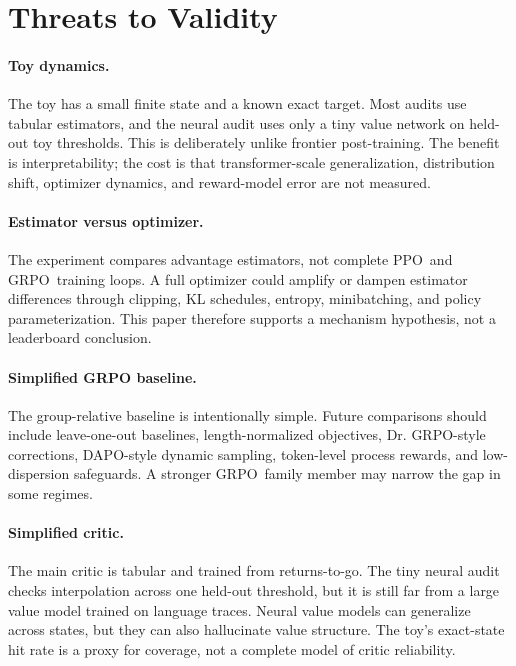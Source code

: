 \documentclass[11pt]{article}
\newcommand{\grpo}{\textsc{GRPO}}
\newcommand{\ppo}{\textsc{PPO}}
\begin{document}
\section{Threats to Validity}

\paragraph{Toy dynamics.}
The toy has a small finite state and a known exact target. Most audits use tabular
estimators, and the neural audit uses only a tiny value network on held-out toy
thresholds. This is deliberately unlike frontier post-training. The benefit is
interpretability; the cost is that transformer-scale generalization,
distribution shift, optimizer dynamics, and reward-model error are not measured.

\paragraph{Estimator versus optimizer.}
The experiment compares advantage estimators, not complete \ppo\ and \grpo\
training loops. A full optimizer could amplify or dampen estimator differences
through clipping, KL schedules, entropy, minibatching, and policy
parameterization. This paper therefore supports a mechanism hypothesis, not a
leaderboard conclusion.

\paragraph{Simplified GRPO baseline.}
The group-relative baseline is intentionally simple. Future comparisons should
include leave-one-out baselines, length-normalized objectives, Dr. GRPO-style
corrections, DAPO-style dynamic sampling, token-level process rewards, and
low-dispersion safeguards. A stronger \grpo\ family member may narrow the gap
in some regimes.

\paragraph{Simplified critic.}
The main critic is tabular and trained from returns-to-go. The tiny neural audit
checks interpolation across one held-out threshold, but it is still far from a
large value model trained on language traces. Neural value models can generalize
across states, but they can also hallucinate value structure. The toy's
exact-state hit rate is a proxy for coverage, not a complete model of critic
reliability.
\end{document}
